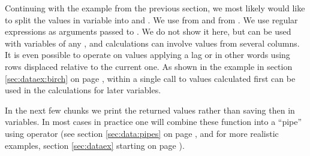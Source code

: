 \documentclass[krantz2]{krantz}\usepackage{knitr}%
\begin{document}
Continuing with the example from the previous section, we most likely would like to split the values in variable  into  and . We use  from  and  from . We use regular expressions as arguments passed to .  We do not show it here, but  can be used with variables of any , and calculations can involve values from several columns. It is even possible to operate on values applying a lag or in other words using rows displaced relative to the current one. As shown in the example in section \ref{sec:dataex:birch} on page \pageref{sec:dataex:birch}, within a single call to  values calculated first can be used in the calculations for later variables.

\begin{knitrout}\footnotesize
{}\color{fgcolor}
\end{knitrout}

In the next few chunks we print the returned values rather than saving then in variables. In most cases in practice one will combine these function into a ``pipe'' using operator  (see section \ref{sec:data:pipes} on page \pageref{sec:data:pipes}, and for more realistic examples, section \ref{sec:dataex} starting on page \pageref{sec:dataex}).
\end{document}
